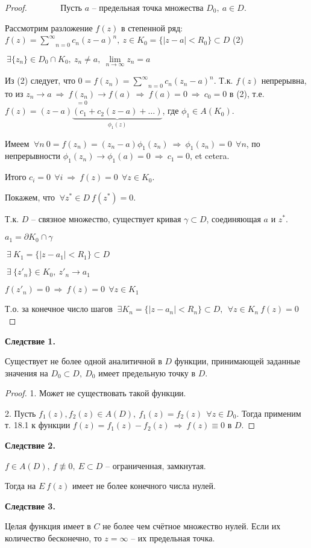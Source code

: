 \documentclass[final]{report}
\newcommand{\forcenewline}{$\phantom{\mbox{newline}}$\newline}
\newcommand{\dd}{\partial}
\newcommand{\then}{\ \Rightarrow\ }
\newcommand{\msum}[2]{\underset{#1}{\overset{#2}{\sum}}}
\newcommand{\ssum}{\msum{n=0}{\infty}}
\newcommand{\mlim}[1]{\underset{#1}{\lim}}
\newcommand{\g}{\gamma}
\renewcommand{\f}{\phi}
\newcommand{\E}{\ \exists}
\newcommand{\F}{\ \forall}
\theoremstyle{remark}
\begin{document}
\begin{proof}
\forcenewline
Пусть $a$ -- предельная точка множества $D_0,\ a\in D$. 

Рассмотрим разложение $f(z)$ в степенной ряд: $f(z)=\ssum c_n(z-a)^n,\ z\in K_0=\{|z-a|<R_0\}\subset D$ (2)

$\E \{z_n\}\in D_0\cap K_0,\ z_n\neq a,\ \mlim{n\to\infty}z_n=a$

Из (2) следует, что $0=f(z_n)=\ssum c_n(z_n-a)^n$. Т.к. $f(z)$ непрерывна, то из $z_n\to a\then \underset{=0}{f(z_n)}\to f(a)\then f(a)=0\then c_0=0$ в (2), т.е. $f(z)=(z-a)\underset{\f_1(z)}{\underbrace{(c_1+c_2(z-a)+\ldots)}}$, где $\f_1\in A(K_0)$.

Имеем $\F n\ 0=f(z_n)=(z_n-a)\f_1(z_n) \then \f_1(z_n)=0\ \F n$, по непрерывности $\f_1(z_n)\to\f_1(a)=0\then c_1=0$, et cetera.

Итого $c_i=0\ \F i\then f(z)=0\ \F z\in K_0$.

Покажем, что $\F z^*\in D\ f(z^*)=0$.

Т.к. $D$ -- связное множество, существует кривая $\g\subset D$, соединяющая $a$ и $z^*$.

$a_1=\dd K_0\cap\g$

$\E\ K_1=\{|z-a_1|<R_1\}\subset D$

$\E\ \{z'_n\}\in K_0,\ z'_n\to a_1$

$f(z'_n)=0\then f(z)=0\ \F z\in K_1$

Т.о. за конечное число шагов $\E K_n=\{|z-a_n|<R_n\}\subset D,\ \F z\in K_n\ f(z)=0$
\end{proof}

{\bfseries Следствие 1.}

Существует не более одной аналитичной в $D$ функции, принимающей заданные значения на $D_0\subset D,\ D_0$ имеет предельную точку в $D$.
\begin{proof}
1. Может не существовать такой функции.

2. Пусть $f_1(z),f_2(z)\in A(D),\ f_1(z)=f_2(z)\ \F z\in D_0$. Тогда применим т. 18.1 к функции $f(z)=f_1(z)-f_2(z)\then f(z)\equiv 0$ в $D$.
\end{proof}

{\bfseries Следствие 2.}

$f\in A(D),\ f\not\equiv0,\ E\subset D$ -- ограниченная, замкнутая.

Тогда на $E\ f(z)$ имеет не более конечного числа нулей.

{\bfseries Следствие 3.}

Целая функция имеет в $C$ не более чем счётное множество нулей. Если их количество бесконечно, то $z=\infty$ -- их предельная точка.
\end{document}
